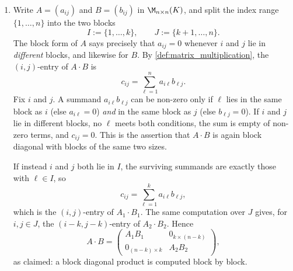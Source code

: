 \begin{exercisesolution}
\label{sol:block_diagonal_upper_triangular_mult}
\begin{enumerate}[label=\textbf{(\alph*)}]
    \item Write $A = (a_{ij})$ and $B = (b_{ij})$ in $\M_{n \times n}(K)$, and split the index range $\{1, \dots, n\}$ into the two blocks
    \[
        I := \{1, \dots, k\}, \qquad J := \{k+1, \dots, n\}.
    \]
    The block form of $A$ says precisely that $a_{ij} = 0$ whenever $i$ and $j$ lie in \emph{different} blocks, and likewise for $B$. By \cref{def:matrix_multiplication}, the $(i,j)$-entry of $A \cdot B$ is
    \[
        c_{ij} = \sum_{\ell = 1}^{n} a_{i\ell} b_{\ell j}.
    \]
    Fix $i$ and $j$. A summand $a_{i\ell} b_{\ell j}$ can be non-zero only if $\ell$ lies in the same block as $i$ (else $a_{i\ell} = 0$) \emph{and} in the same block as $j$ (else $b_{\ell j} = 0$). If $i$ and $j$ lie in different blocks, no $\ell$ meets both conditions, the sum is empty of non-zero terms, and $c_{ij} = 0$. This is the assertion that $A \cdot B$ is again block diagonal with blocks of the same two sizes.

    If instead $i$ and $j$ both lie in $I$, the surviving summands are exactly those with $\ell \in I$, so
    \[
        c_{ij} = \sum_{\ell = 1}^{k} a_{i\ell} b_{\ell j},
    \]
    which is the $(i,j)$-entry of $A_1 \cdot B_1$. The same computation over $J$ gives, for $i, j \in J$, the $(i-k, j-k)$-entry of $A_2 \cdot B_2$. Hence
    \[
        A \cdot B = \begin{pmatrix} A_1 B_1 & 0_{k \times (n-k)} \\ 0_{(n-k) \times k} & A_2 B_2 \end{pmatrix},
    \]
    as claimed: a block diagonal product is computed block by block.


\end{enumerate}
\end{exercisesolution}
